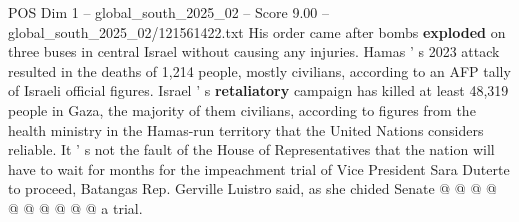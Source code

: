 \begin{textsample}{POS Dim 1 – global\_south\_2025\_02 – Score 9.00 – global\_south\_2025\_02/121561422.txt}
His order came after bombs \textbf{exploded} on three buses in central Israel without causing any injuries.
Hamas ' s 2023 attack resulted in the deaths of 1,214 people, mostly civilians, according to an AFP tally of Israeli official figures.
Israel ' s \textbf{retaliatory} campaign has killed at least 48,319 people in Gaza, the majority of them civilians, according to figures from the health ministry in the Hamas-run territory that the United Nations considers reliable.
It ' s not the fault of the House of Representatives that the nation will have to wait for months for the impeachment trial of Vice President Sara Duterte to proceed, Batangas Rep.
Gerville Luistro said, as she chided Senate @ @ @ @ @ @ @ @ @ @ a trial.

\end{textsample}
